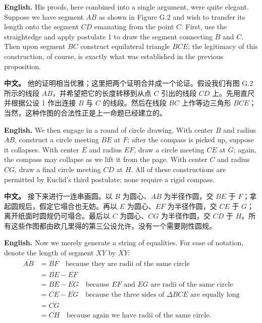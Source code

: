 \noindent\textbf{English.} His proofs, here combined into a single argument, were quite elegant. Suppose we have segment $AB$ as shown in Figure G.2 and wish to transfer its length onto the segment $CD$ emanating from the point $C$. First, use the straightedge and apply postulate 1 to draw the segment connecting $B$ and $C$. Then upon segment $BC$ construct equilateral triangle $BCE$; the legitimacy of this construction, of course, is exactly what was established in the previous proposition.

\noindent\textbf{中文。} 他的证明相当优雅；这里把两个证明合并成一个论证。假设我们有图 G.2 所示的线段 $AB$，并希望把它的长度转移到从点 $C$ 引出的线段 $CD$ 上。先用直尺并根据公设 1 作出连接 $B$ 与 $C$ 的线段。然后在线段 $BC$ 上作等边三角形 $BCE$；当然，这种作图的合法性正是上一命题已经建立的。

\noindent\textbf{English.} We then engage in a round of circle drawing. With center $B$ and radius $AB$, construct a circle meeting $BE$ at $F$; after the compass is picked up, suppose it collapses. With center $E$ and radius $EF$, draw a circle meeting $CE$ at $G$; again, the compass may collapse as we lift it from the page. With center $C$ and radius $CG$, draw a final circle meeting $CD$ at $H$. All of these constructions are permitted by Euclid's third postulate; none require a rigid compass.

\noindent\textbf{中文。} 接下来进行一连串画圆。以 $B$ 为圆心、$AB$ 为半径作圆，交 $BE$ 于 $F$；拿起圆规后，假定它塌合也无妨。再以 $E$ 为圆心、$EF$ 为半径作圆，交 $CE$ 于 $G$；离开纸面时圆规仍可塌合。最后以 $C$ 为圆心、$CG$ 为半径作圆，交 $CD$ 于 $H$。所有这些作图都由欧几里得的第三公设允许，没有一个需要刚性圆规。

\noindent\textbf{English.} Now we merely generate a string of equalities. For ease of notation, denote the length of segment $XY$ by $\overline{XY}$:
\[
\begin{array}{rl}
\overline{AB} &= \overline{BF} \quad \text{because they are radii of the same circle}\\
&= \overline{BE}-\overline{EF}\\
&= \overline{BE}-\overline{EG} \quad \text{because } EF \text{ and } EG \text{ are radii of the same circle}\\
&= \overline{CE}-\overline{EG} \quad \text{because the three sides of } \Delta BCE \text{ are equally long}\\
&= \overline{CG}\\
&= \overline{CH} \quad \text{because again we have radii of the same circle.}
\end{array}
\]

